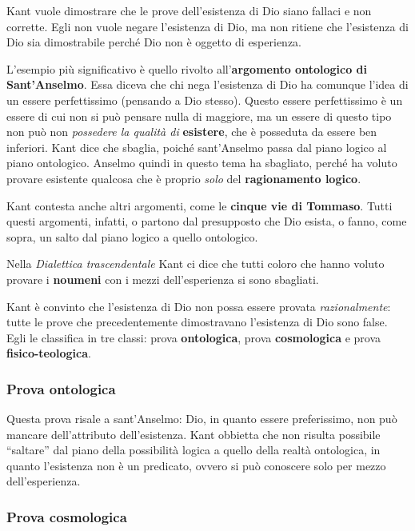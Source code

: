 \documentclass[a4paper, twoside, titlepage]{book}
\begin{document}
Kant vuole dimostrare che le prove dell’esistenza di Dio siano fallaci e non corrette. Egli non vuole negare l’esistenza di Dio, ma non ritiene che l’esistenza di Dio sia dimostrabile perché Dio non è oggetto di esperienza.

L’esempio più significativo è quello rivolto all’\textbf{argomento ontologico di Sant’Anselmo}. Essa diceva che chi nega l’esistenza di Dio ha comunque l’idea di un essere perfettissimo (pensando a Dio stesso). Questo essere perfettissimo è un essere di cui non si può pensare nulla di maggiore, ma un essere di questo tipo non può non \textit{possedere la qualità di} \textbf{esistere}, che è posseduta da essere ben inferiori.
Kant dice che sbaglia, poiché sant’Anselmo passa dal piano logico al piano ontologico. Anselmo quindi in questo tema ha sbagliato, perché ha voluto provare esistente qualcosa che è proprio \textit{solo} del \textbf{ragionamento logico}.

Kant contesta anche altri argomenti, come le \textbf{cinque vie di Tommaso}. Tutti questi argomenti, infatti, o partono dal presupposto che Dio esista, o fanno, come sopra, un salto dal piano logico a quello ontologico.

Nella \textit{Dialettica trascendentale} Kant ci dice che tutti coloro che hanno voluto provare i \textbf{noumeni} con i mezzi dell’esperienza si sono sbagliati.

Kant è convinto che l’esistenza di Dio non possa essere provata \textit{razionalmente}: tutte le prove che precedentemente dimostravano l’esistenza di Dio sono false. Egli le classifica in tre classi: prova \textbf{ontologica}, prova \textbf{cosmologica} e prova \textbf{fisico-teologica}.

\subsubsection{Prova ontologica}

Questa prova risale a sant’Anselmo: Dio, in quanto essere preferissimo, non può mancare dell’attributo dell’esistenza.
Kant obbietta che non risulta possibile “saltare” dal piano della possibilità logica a quello della realtà ontologica, in quanto l’esistenza non è un predicato, ovvero si può conoscere solo per mezzo dell’esperienza.

\subsubsection{Prova cosmologica}
\end{document}
